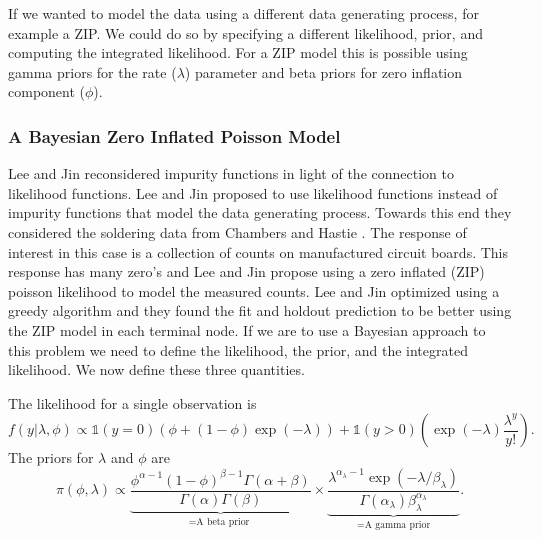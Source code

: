 \documentclass{article}
\begin{document}
If we wanted to model the data using a different data generating process, for example a ZIP. We could do so by specifying a different likelihood, prior, and computing the integrated likelihood. For a ZIP model this is possible using gamma priors for the rate ($\lambda$) parameter and beta priors for zero inflation component ($\phi$). 
 
 \subsubsection{A Bayesian Zero Inflated Poisson Model}
 
 Lee and Jin \cite{lee2006decision} reconsidered impurity functions in light of the connection to likelihood functions. Lee and Jin \cite{lee2006decision} proposed to use likelihood functions instead of impurity functions that model the data generating process. Towards this end they considered the soldering data from Chambers and Hastie \cite{chambers1992statistical}. The response of interest in this case is a collection of counts on manufactured circuit boards. This response has many zero's and Lee and Jin \cite{lee2006decision} propose using a zero inflated (ZIP) poisson likelihood to model the measured counts. Lee and Jin \cite{lee2006decision} optimized using a greedy algorithm and they found the fit and holdout prediction to be better using the ZIP model in each terminal node. If we are to use a Bayesian approach to this problem we need to define the likelihood, the prior, and the integrated likelihood. We now define these three quantities.
 
 The likelihood for a single observation is 
 \begin{equation}
 f(y\vert \lambda, \phi) \propto \mathds{1}(y=0)\left(\phi + (1-\phi)\exp{(-\lambda)}\right) + \mathds{1}(y>0)\left(\exp{(-\lambda)}\frac{\lambda^y}{y!}\right).
 \end{equation}
 The priors for $\lambda$ and $\phi$ are
 \begin{equation}
 \pi(\phi, \lambda)\propto \underbrace{\frac{\phi^{\alpha-1}(1-\phi)^{\beta-1}\Gamma(\alpha+\beta)}{\Gamma(\alpha)\Gamma(\beta)}}_{=\text{A beta prior }} \times \underbrace{\frac{ \lambda^{\alpha_{\lambda}-1}\exp{(-\lambda/\beta_{\lambda})} }{\Gamma(\alpha_{\lambda})\beta_{\lambda}^{\alpha_{\lambda}}}}_{=\text{A gamma prior}}.
 \end{equation}
\end{document}
